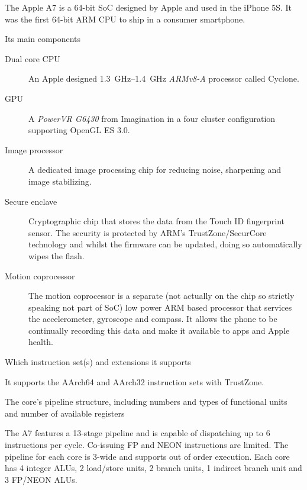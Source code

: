 \documentclass{supervision}
\begin{document}
\begin{questions}
    \begin{solution}
    The Apple A7 is a 64-bit SoC designed by Apple and used in the iPhone 5S. It was the first 64-bit ARM CPU to ship in a consumer smartphone.
    \end{solution}

    \question
    Its main components
    \begin{solution}
    \begin{description}
        \item[Dual core CPU]
        An Apple designed \SIrange{1.3}{1.4}{\GHz} \emph{ARMv8-A} processor called Cyclone.
        \item[GPU]
        A \emph{PowerVR G6430} from Imagination in a four cluster configuration supporting OpenGL ES 3.0.
        \item[Image processor]
        A dedicated image processing chip for reducing noise, sharpening and image stabilizing.
        \item[Secure enclave] 
        Cryptographic chip that stores the data from the Touch ID fingerprint sensor. The security is protected by ARM's TrustZone/SecurCore technology and whilst the firmware can be updated, doing so automatically wipes the flash.
        \item[Motion coprocessor]
        The motion coprocessor is a separate (not actually on the chip so strictly speaking not part of SoC) low power ARM based processor that services the accelerometer, gyroscope and compass. It allows the phone to be continually recording this data and make it available to apps and Apple health.
        
    \end{description}
    \end{solution}

    \question
    Which instruction set(s) and extensions it supports
    \begin{solution}
    It supports the AArch64 and AArch32 instruction sets with TrustZone.
    \end{solution}

    \question
    The core's pipeline structure, including numbers and types of functional units and number of available registers
    \begin{solution}
    The A7 features a 13-stage pipeline and is capable of dispatching up to 6 instructions per cycle. Co-issuing FP and NEON instructions are limited. The pipeline for each core is 3-wide and supports out of order execution. Each core has 4 integer ALUs, 2 load/store units, 2 branch units, 1 indirect branch unit and 3 FP/NEON ALUs.
    

\end{solution}
\end{questions}
\end{document}
